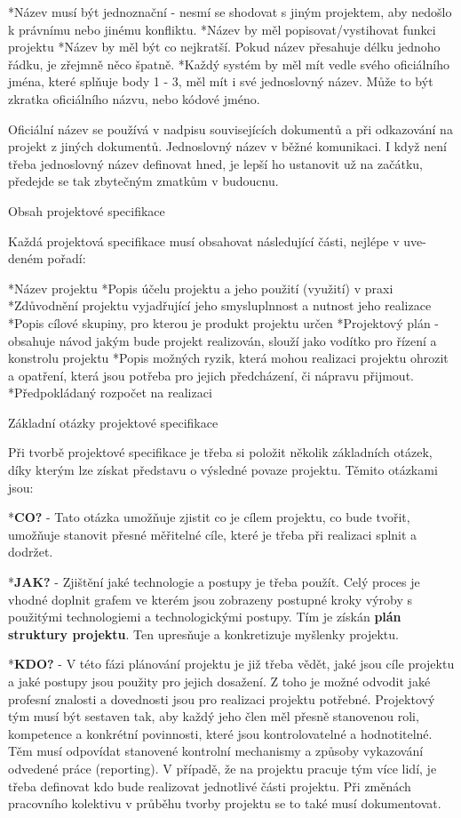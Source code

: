 \begitems
*Název musí být jednoznační - nesmí se shodovat s jiným projektem, aby nedošlo k právnímu nebo jinému konfliktu.
*Název by měl popisovat/vystihovat funkci projektu
*Název by měl být co nejkratší. Pokud název přesahuje délku jednoho
řádku, je zřejmně něco špatně.
*Každý systém by měl mít vedle svého oficiálního jména, které splňuje body 1 - 3, měl mít i své jednoslovný název. Může to být zkratka oficiálního
názvu, nebo kódové jméno.
\enditems

Oficiální název se používá v nadpisu souvisejících dokumentů a při odkazování na projekt z jiných dokumentů. Jednoslovný název v běžné komunikaci. I když není třeba jednoslovný název definovat hned, je lepší ho ustanovit už na začátku, předejde se tak zbytečným zmatkům v budoucnu.


\sec Obsah projektové specifikace

Každá projektová specifikace musí obsahovat následující části, nejlépe v uve-
deném pořadí:

\begitems
*Název projektu
*Popis účelu projektu a jeho použití (využití) v praxi
*Zdůvodnění projektu vyjadřující jeho smysluplnnost a nutnost jeho realizace
*Popis cílové skupiny, pro kterou je produkt projektu určen
*Projektový plán - obsahuje návod jakým bude projekt realizován, slouží jako vodítko pro řízení a konstrolu projektu 
*Popis možných ryzik, která mohou realizaci projektu ohrozit a opatření, která jsou potřeba pro jejich předcházení, či nápravu přijmout.
*Předpokládaný rozpočet na realizaci
\enditems

\sec Základní otázky projektové specifikace

Při tvorbě projektové specifikace je třeba si položit několik základních otázek,
díky kterým lze získat představu o výsledné povaze projektu. Těmito otázkami
jsou:

\begitems
*{\bf CO?} - Tato otázka umožňuje zjistit co je cílem projektu, co bude tvořit, umožňuje stanovit přesné měřitelné cíle, které je třeba při realizaci splnit a dodržet.

*{\bf JAK?} - Zjištění jaké technologie a postupy je třeba použít. Celý proces je vhodné doplnit grafem ve kterém jsou zobrazeny postupné kroky výroby s použitými technologiemi a technologickými postupy. Tím je získán {\bf plán struktury projektu}. Ten upresňuje a konkretizuje myšlenky projektu.

*{\bf KDO?} - V této fázi plánování projektu je již třeba vědět, jaké jsou cíle projektu a jaké postupy jsou použity pro jejich dosažení. Z toho je možné odvodit jaké profesní znalosti a dovednosti jsou pro realizaci projektu potřebné. Projektový tým musí být sestaven tak, aby každý jeho člen měl přesně stanovenou roli, kompetence a konkrétní povinnosti, které jsou kontrolovatelné a hodnotitelné. Těm musí odpovídat stanovené kontrolní mechanismy a způsoby vykazování odvedené práce (reporting). V případě, že na projektu pracuje tým více lidí, je třeba definovat kdo bude realizovat jednotlivé části projektu. Při změnách pracovního
kolektivu v průběhu tvorby projektu se to také musí dokumentovat.


